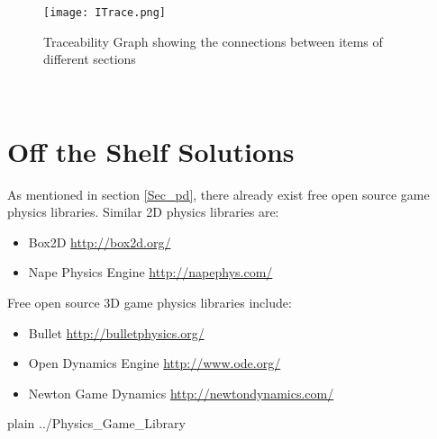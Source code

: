 \documentclass[12pt]{article}
\begin{document}
\begin{figure}[h!]
	\begin{center}
		\texttt{[image: ITrace.png]}
		\bigskip
		\caption{Traceability Graph showing the connections between items of different sections}
		\label{Fig_ITrace}
	\end{center}
\end{figure}

~\pagebreak

%
%

\section{Off the Shelf Solutions}   \label{sec_otss}
As mentioned in section \ref{Sec_pd}, there already exist free open source game
physics libraries. Similar 2D physics libraries are:
\begin{itemize} 
\item Box2D   \url{http://box2d.org/}
\item Nape Physics Engine  \url{http://napephys.com/}
\end{itemize}

\noindent
Free open source 3D game physics libraries include:
\begin{itemize} 
\item Bullet   \url{http://bulletphysics.org/}
\item Open Dynamics Engine  \url{http://www.ode.org/}
\item Newton Game Dynamics  \url{http://newtondynamics.com/}
\end{itemize}

 {plain}
 {../Physics_Game_Library}
\end{document}
